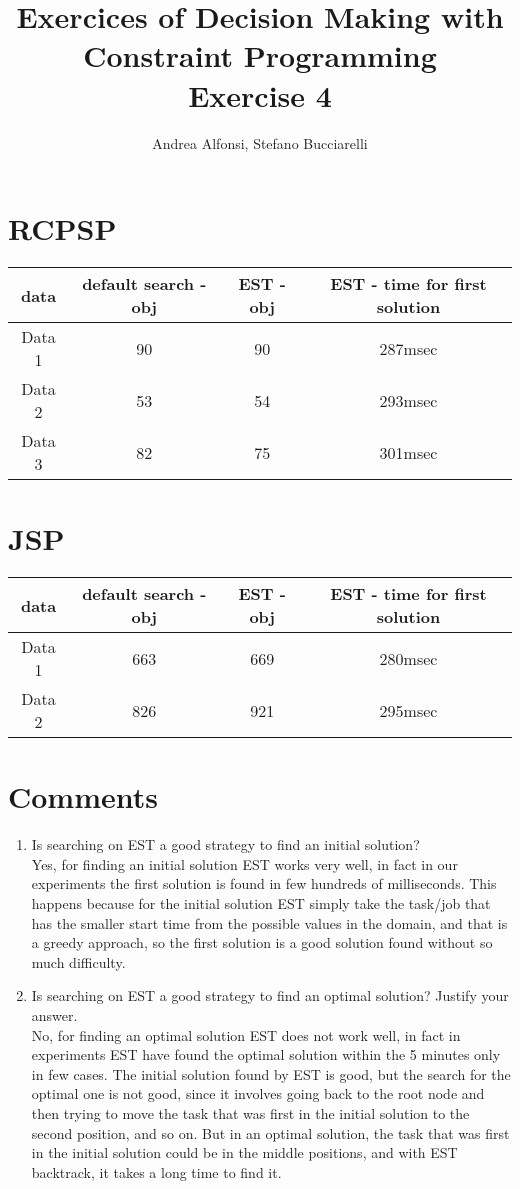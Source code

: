 \documentclass{article}
\title{Exercices of Decision Making with Constraint Programming\\  Exercise 4}
\author{Andrea Alfonsi, Stefano Bucciarelli}
\begin{document}
    \maketitle
    \section{RCPSP}
        \begin{tabular}{||c | c | c | c ||}
    \hline       
        data & default search - obj & EST - obj & EST - time for first solution \\  \hline
        Data 1 & 90 & 90  & 287msec \\ \hline
        Data 2 & 53 & 54  & 293msec \\ \hline
        Data 3 & 82 & 75  & 301msec \\ \hline    
    \end{tabular}   
    \section{JSP}
    \begin{tabular}{||c | c | c | c ||}
    \hline       
        data & default search - obj & EST - obj & EST - time for first solution \\  \hline
        Data 1 & 663 & 669 & 280msec \\  \hline
        Data 2 & 826 & 921 & 295msec \\  \hline
    \end{tabular}  
    \section{Comments}
    \begin{enumerate}
        \item Is searching on EST a good strategy to find an initial solution? \\
        Yes, for finding an initial solution EST works very well, in fact in our experiments the first solution is found in few hundreds of milliseconds. This happens because for the initial solution EST simply take the task/job that has the smaller start time from the possible values in the domain, and that is a greedy approach, so the first solution is a good solution found without so much difficulty.
        \item Is searching on EST a good strategy to find an optimal solution? Justify your answer. \\
        No, for finding an optimal solution EST does not work well, in fact in experiments EST have found the optimal solution within the 5 minutes only in few cases.
        The initial solution found by EST is good, but the search for the optimal one is not good, since it involves going back to the root node and then trying to move the task that was first in the initial solution to the second position, and so on. But in an optimal solution, the task that was first in the initial solution could be in the middle positions, and with EST backtrack, it takes a long time to find it. 
    \end{enumerate}
\end{document}

